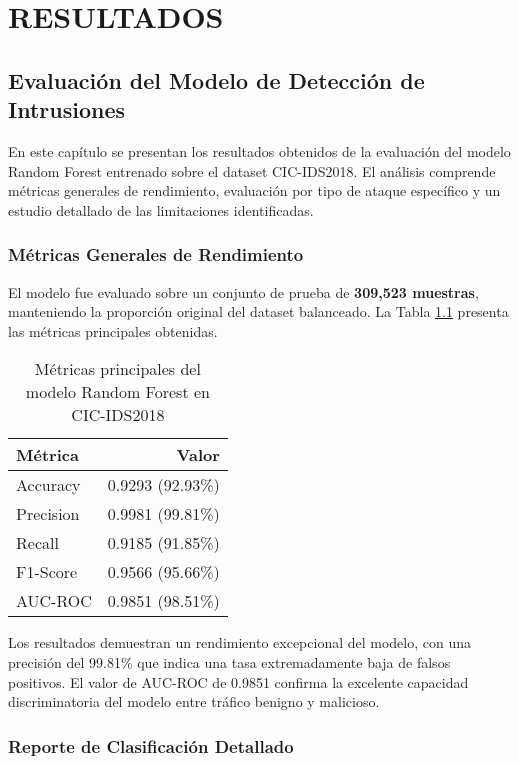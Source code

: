\chapter{RESULTADOS}\label{ch:resultados}

\section{Evaluación del Modelo de Detección de Intrusiones}

En este capítulo se presentan los resultados obtenidos de la evaluación del modelo Random Forest entrenado sobre el dataset CIC-IDS2018. El análisis comprende métricas generales de rendimiento, evaluación por tipo de ataque específico y un estudio detallado de las limitaciones identificadas.

\subsection{Métricas Generales de Rendimiento}

El modelo fue evaluado sobre un conjunto de prueba de \textbf{309,523 muestras}, manteniendo la proporción original del dataset balanceado. La Tabla \ref{tab:main_results} presenta las métricas principales obtenidas.

\begin{table}[H]
\centering
\begin{tabular}{lr}
\toprule
\textbf{Métrica} & \textbf{Valor} \\
\midrule
Accuracy & 0.9293 (92.93\%) \\
Precision & 0.9981 (99.81\%) \\
Recall & 0.9185 (91.85\%) \\
F1-Score & 0.9566 (95.66\%) \\
AUC-ROC & 0.9851 (98.51\%) \\
\bottomrule
\end{tabular}
\caption{Métricas principales del modelo Random Forest en CIC-IDS2018}
\label{tab:main_results}
\end{table}

Los resultados demuestran un rendimiento excepcional del modelo, con una precisión del 99.81\% que indica una tasa extremadamente baja de falsos positivos. El valor de AUC-ROC de 0.9851 confirma la excelente capacidad discriminatoria del modelo entre tráfico benigno y malicioso.

\subsection{Reporte de Clasificación Detallado}

